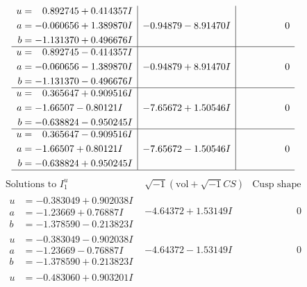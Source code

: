 \documentclass[1p]{elsarticle_modified}
\theoremstyle{definition}
\newcommand{\I}{\sqrt{-1}}
\begin{document}
$$\begin{array}{c|c|c}
\begin{aligned}
u &= \phantom{-}0.892745 + 0.414357 I \\
a &= -0.060656 + 1.389870 I \\
b &= -1.131370 + 0.496676 I\end{aligned}
 & -0.94879 - 8.91470 I & \phantom{-0.000000 } 0 \\ \hline\begin{aligned}
u &= \phantom{-}0.892745 - 0.414357 I \\
a &= -0.060656 - 1.389870 I \\
b &= -1.131370 - 0.496676 I\end{aligned}
 & -0.94879 + 8.91470 I & \phantom{-0.000000 } 0 \\ \hline\begin{aligned}
u &= \phantom{-}0.365647 + 0.909516 I \\
a &= -1.66507 - 0.80121 I \\
b &= -0.638824 - 0.950245 I\end{aligned}
 & -7.65672 + 1.50546 I & \phantom{-0.000000 } 0 \\ \hline\begin{aligned}
u &= \phantom{-}0.365647 - 0.909516 I \\
a &= -1.66507 + 0.80121 I \\
b &= -0.638824 + 0.950245 I\end{aligned}
 & -7.65672 - 1.50546 I & \phantom{-0.000000 } 0\\
 \hline 
 \end{array}$$\newpage$$\begin{array}{c|c|c}  
\text{Solutions to }I^u_{1}& \I (\text{vol} + \sqrt{-1}CS) & \text{Cusp shape}\\
 \hline 
\begin{aligned}
u &= -0.383049 + 0.902038 I \\
a &= -1.23669 + 0.76887 I \\
b &= -1.378590 - 0.213823 I\end{aligned}
 & -4.64372 + 1.53149 I & \phantom{-0.000000 } 0 \\ \hline\begin{aligned}
u &= -0.383049 - 0.902038 I \\
a &= -1.23669 - 0.76887 I \\
b &= -1.378590 + 0.213823 I\end{aligned}
 & -4.64372 - 1.53149 I & \phantom{-0.000000 } 0 \\ \hline\begin{aligned}
u &= -0.483060 + 0.903201 I \\

\end{aligned}
\end{array}$$
\end{document}
